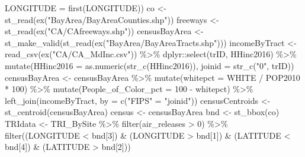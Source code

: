 \documentclass[
]{book}
\newenvironment{Shaded}{\begin{snugshade}}{\end{snugshade}}
\newcommand{\AttributeTok}[1]{\textcolor[rgb]{0.61,0.61,0.61}{#1}}
\newcommand{\DecValTok}[1]{\textcolor[rgb]{0.06,0.06,0.06}{#1}}
\newcommand{\FunctionTok}[1]{\textcolor[rgb]{0,0,0}{#1}}
\newcommand{\NormalTok}[1]{#1}
\newcommand{\OtherTok}[1]{\textcolor[rgb]{0.37,0.37,0.37}{#1}}
\newcommand{\SpecialCharTok}[1]{\textcolor[rgb]{0,0,0}{#1}}
\newcommand{\StringTok}[1]{\textcolor[rgb]{0.5,0.5,0.5}{#1}}
\begin{document}
\begin{Shaded}
\begin{Highlighting}[]
    \AttributeTok{LONGITUDE =} \FunctionTok{first}\NormalTok{(LONGITUDE))}
\NormalTok{co }\OtherTok{\textless{}{-}} \FunctionTok{st\_read}\NormalTok{(}\FunctionTok{ex}\NormalTok{(}\StringTok{"BayArea/BayAreaCounties.shp"}\NormalTok{))        }
\NormalTok{freeways }\OtherTok{\textless{}{-}} \FunctionTok{st\_read}\NormalTok{(}\FunctionTok{ex}\NormalTok{(}\StringTok{"CA/CAfreeways.shp"}\NormalTok{))          }
\NormalTok{censusBayArea }\OtherTok{\textless{}{-}} \FunctionTok{st\_make\_valid}\NormalTok{(}\FunctionTok{st\_read}\NormalTok{(}\FunctionTok{ex}\NormalTok{(}\StringTok{"BayArea/BayAreaTracts.shp"}\NormalTok{))) }
\NormalTok{incomeByTract }\OtherTok{\textless{}{-}} \FunctionTok{read\_csv}\NormalTok{(}\FunctionTok{ex}\NormalTok{(}\StringTok{"CA/CA\_MdInc.csv"}\NormalTok{)) }\SpecialCharTok{\%\textgreater{}\%}
\NormalTok{  dplyr}\SpecialCharTok{::}\FunctionTok{select}\NormalTok{(trID, HHinc2016) }\SpecialCharTok{\%\textgreater{}\%}
  \FunctionTok{mutate}\NormalTok{(}\AttributeTok{HHinc2016 =} \FunctionTok{as.numeric}\NormalTok{(}\FunctionTok{str\_c}\NormalTok{(HHinc2016)),}
         \AttributeTok{joinid =} \FunctionTok{str\_c}\NormalTok{(}\StringTok{"0"}\NormalTok{, trID))}
\NormalTok{censusBayArea }\OtherTok{\textless{}{-}}\NormalTok{ censusBayArea }\SpecialCharTok{\%\textgreater{}\%}
  \FunctionTok{mutate}\NormalTok{(}\AttributeTok{whitepct =}\NormalTok{ WHITE }\SpecialCharTok{/}\NormalTok{ POP2010 }\SpecialCharTok{*} \DecValTok{100}\NormalTok{) }\SpecialCharTok{\%\textgreater{}\%}
  \FunctionTok{mutate}\NormalTok{(}\AttributeTok{People\_of\_Color\_pct =} \DecValTok{100} \SpecialCharTok{{-}}\NormalTok{ whitepct) }\SpecialCharTok{\%\textgreater{}\%}
  \FunctionTok{left\_join}\NormalTok{(incomeByTract, }\AttributeTok{by =} \FunctionTok{c}\NormalTok{(}\StringTok{"FIPS"} \OtherTok{=} \StringTok{"joinid"}\NormalTok{))}
\NormalTok{censusCentroids }\OtherTok{\textless{}{-}} \FunctionTok{st\_centroid}\NormalTok{(censusBayArea)}
\NormalTok{census }\OtherTok{\textless{}{-}}\NormalTok{ censusBayArea}
\NormalTok{bnd }\OtherTok{\textless{}{-}} \FunctionTok{st\_bbox}\NormalTok{(co)}
\NormalTok{TRIdata }\OtherTok{\textless{}{-}}\NormalTok{ TRI\_BySite }\SpecialCharTok{\%\textgreater{}\%}
  \FunctionTok{filter}\NormalTok{(air\_releases }\SpecialCharTok{\textgreater{}} \DecValTok{0}\NormalTok{) }\SpecialCharTok{\%\textgreater{}\%}
  \FunctionTok{filter}\NormalTok{((LONGITUDE }\SpecialCharTok{\textless{}}\NormalTok{ bnd[}\DecValTok{3}\NormalTok{]) }\SpecialCharTok{\&}\NormalTok{ (LONGITUDE }\SpecialCharTok{\textgreater{}}\NormalTok{ bnd[}\DecValTok{1}\NormalTok{]) }\SpecialCharTok{\&}\NormalTok{ (LATITUDE }\SpecialCharTok{\textless{}}\NormalTok{ bnd[}\DecValTok{4}\NormalTok{]) }\SpecialCharTok{\&}\NormalTok{ (LATITUDE }\SpecialCharTok{\textgreater{}}\NormalTok{ bnd[}\DecValTok{2}\NormalTok{]))}

\end{Highlighting}
\end{Shaded}
\end{document}
